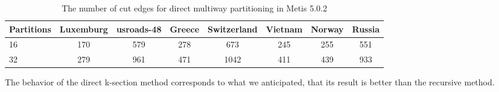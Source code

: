\documentclass[unicode,11pt,a4paper,oneside,numbers=endperiod,openany]{scrartcl}
\begin{document}
\begin{table}[htbp]
    \centering
    \caption{The number of cut edges for direct multiway partitioning in Metis 5.0.2}
    \label{tab:multiway_partitioning}
    \begin{tabular}{lccccccc}
        \toprule
        \textbf{Partitions} & \textbf{Luxemburg} & \textbf{usroads-48} & \textbf{Greece} & \textbf{Switzerland} & \textbf{Vietnam} & \textbf{Norway} & \textbf{Russia} \\
        \midrule
        16 & 170 & 579 & 278 & 673 & 245 & 255 & 551 \\
        32 & 279 & 961 & 471 & 1042 & 411 & 439 & 933 \\
        \bottomrule
    \end{tabular}
\end{table}
The behavior of the direct k-section method corresponds to what we anticipated, that its result is better than the recursive method.
\end{document}
